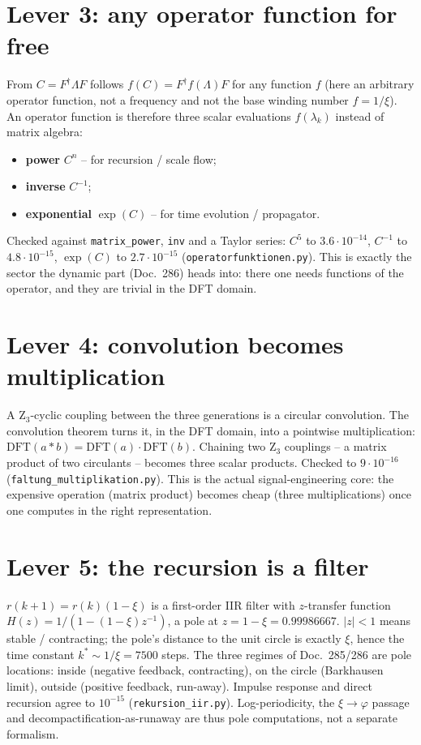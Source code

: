 \section{Lever 3: any operator function for free}
From $C=F^{\dagger}\Lambda F$ follows $f(C)=F^{\dagger}f(\Lambda)F$ for any function $f$ (here an arbitrary
operator function, not a frequency and not the base winding number $f=1/\xi$). An operator
function is therefore three scalar evaluations $f(\lambda_k)$ instead of matrix algebra:
\begin{itemize}
  \item \textbf{power} $C^n$ -- for recursion / scale flow;
  \item \textbf{inverse} $C^{-1}$;
  \item \textbf{exponential} $\exp(C)$ -- for time evolution / propagator.
\end{itemize}
Checked against \texttt{matrix\_power}, \texttt{inv} and a Taylor series: $C^5$ to
$3{.}6\cdot10^{-14}$, $C^{-1}$ to $4{.}8\cdot10^{-15}$, $\exp(C)$ to $2{.}7\cdot10^{-15}$
(\texttt{operatorfunktionen.py}). This is exactly the sector the dynamic part (Doc.~286) heads into:
there one needs functions of the operator, and they are trivial in the DFT domain.

\section{Lever 4: convolution becomes multiplication}
A Z$_3$-cyclic coupling between the three generations is a circular convolution. The convolution
theorem turns it, in the DFT domain, into a pointwise multiplication:
$\mathrm{DFT}(a\ast b)=\mathrm{DFT}(a)\cdot\mathrm{DFT}(b)$. Chaining two Z$_3$ couplings -- a matrix
product of two circulants -- becomes three scalar products. Checked to $9\cdot10^{-16}$
(\texttt{faltung\_multiplikation.py}). This is the actual signal-engineering core: the expensive
operation (matrix product) becomes cheap (three multiplications) once one computes in the right
representation.

\section{Lever 5: the recursion is a filter}
$r(k{+}1)=r(k)(1-\xi)$ is a first-order IIR filter with $z$-transfer function
$H(z)=1/(1-(1-\xi)z^{-1})$, a pole at $z=1-\xi=0{.}99986667$. $|z|<1$ means stable / contracting; the
pole's distance to the unit circle is exactly $\xi$, hence the time constant $k^{*}\sim1/\xi=7500$
steps. The three regimes of Doc.~285/286 are pole locations: inside (negative feedback, contracting),
on the circle (Barkhausen limit), outside (positive feedback, run-away). Impulse response and direct
recursion agree to $10^{-15}$ (\texttt{rekursion\_iir.py}). Log-periodicity, the $\xi\!\to\!\varphi$
passage and decompactification-as-runaway are thus pole computations, not a separate formalism.

